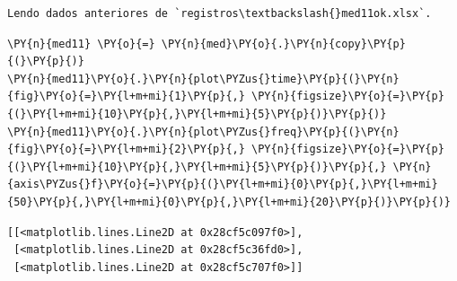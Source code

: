     \begin{Verbatim}[commandchars=\\\{\}]
Lendo dados anteriores de `registros\textbackslash{}med11ok.xlsx`.
    \end{Verbatim}

    

    \begin{tcolorbox}[breakable, size=fbox, boxrule=1pt, pad at break*=1mm,colback=cellbackground, colframe=cellborder]
\begin{Verbatim}[commandchars=\\\{\}]
\PY{n}{med11} \PY{o}{=} \PY{n}{med}\PY{o}{.}\PY{n}{copy}\PY{p}{(}\PY{p}{)}
\PY{n}{med11}\PY{o}{.}\PY{n}{plot\PYZus{}time}\PY{p}{(}\PY{n}{fig}\PY{o}{=}\PY{l+m+mi}{1}\PY{p}{,} \PY{n}{figsize}\PY{o}{=}\PY{p}{(}\PY{l+m+mi}{10}\PY{p}{,}\PY{l+m+mi}{5}\PY{p}{)}\PY{p}{)}
\PY{n}{med11}\PY{o}{.}\PY{n}{plot\PYZus{}freq}\PY{p}{(}\PY{n}{fig}\PY{o}{=}\PY{l+m+mi}{2}\PY{p}{,} \PY{n}{figsize}\PY{o}{=}\PY{p}{(}\PY{l+m+mi}{10}\PY{p}{,}\PY{l+m+mi}{5}\PY{p}{)}\PY{p}{,} \PY{n}{axis\PYZus{}f}\PY{o}{=}\PY{p}{(}\PY{l+m+mi}{0}\PY{p}{,}\PY{l+m+mi}{50}\PY{p}{,}\PY{l+m+mi}{0}\PY{p}{,}\PY{l+m+mi}{20}\PY{p}{)}\PY{p}{)}
\end{Verbatim}
\end{tcolorbox}

            \begin{tcolorbox}[breakable, size=fbox, boxrule=.5pt, pad at break*=1mm, opacityfill=0]
\begin{Verbatim}[commandchars=\\\{\}]
[[<matplotlib.lines.Line2D at 0x28cf5c097f0>],
 [<matplotlib.lines.Line2D at 0x28cf5c36fd0>],
 [<matplotlib.lines.Line2D at 0x28cf5c707f0>]]
\end{Verbatim}
\end{tcolorbox}
        
    \begin{center}
    \end{center}
    { \hspace*{\fill} \\}
    
    \begin{center}
    \end{center}
    { \hspace*{\fill} \\}
    
